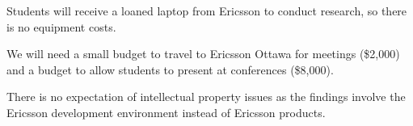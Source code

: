 \documentclass[12pt, letterpaper]{article}
\begin{document}
Students will receive a loaned laptop from Ericsson to conduct research, so there is no equipment costs.

We will need a small budget to travel to Ericsson Ottawa for meetings (\$2,000) and a budget to allow students to present at conferences (\$8,000).

There is no expectation of intellectual property issues as the findings involve
the Ericsson development environment instead of Ericsson products.
\end{document}

